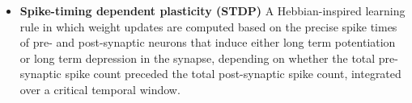 \begin{itemize}
\item \textbf{Spike-timing dependent plasticity (STDP)} A Hebbian-inspired learning rule in which weight updates are computed based on the precise spike times of pre- and post-synaptic neurons that induce either long term potentiation or long term depression in the synapse, depending on whether the total pre-synaptic spike count preceded the total post-synaptic spike count, integrated over a critical temporal window.

\end{itemize}